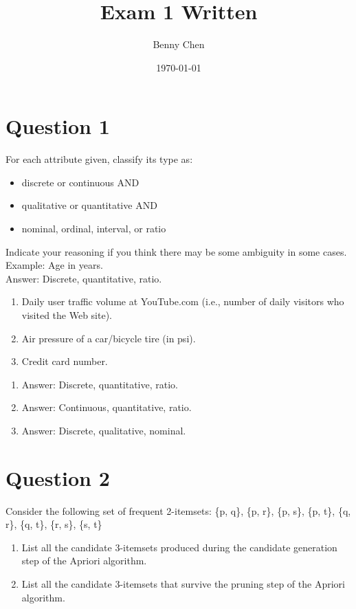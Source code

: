 \documentclass{article}
\title{Exam 1 Written}
\author{Benny Chen}
\date{\today}
\begin{document}
\maketitle

\section*{Question 1}

For each attribute given, classify its type as:

\begin{itemize}
    \item discrete or continuous AND
    \item qualitative or quantitative AND 
    \item nominal, ordinal, interval, or ratio
\end{itemize}

\noindent
Indicate your reasoning if you think there may be some ambiguity in some cases.
\\
Example: Age in years.\\
Answer: Discrete, quantitative, ratio.

\begin{enumerate}[label=(\alph*)]
    \item Daily user traffic volume at YouTube.com (i.e., number of daily visitors who visited the Web site).
    \item Air pressure of a car/bicycle tire (in psi).
    \item Credit card number.
\end{enumerate}

\begin{enumerate}[label=(\alph*)]
    \item Answer: Discrete, quantitative, ratio.
    \item Answer: Continuous, quantitative, ratio.
    \item Answer: Discrete, qualitative, nominal.
\end{enumerate}

\section*{Question 2}

Consider the following set of frequent 2-itemsets:
\{p, q\}, \{p, r\}, \{p, s\}, \{p, t\}, \{q, r\}, \{q, t\}, \{r, s\}, \{s, t\}
\begin{enumerate}[label=(\alph*)]
    \item List all the candidate 3-itemsets produced during the candidate generation step of the Apriori algorithm.
    \item List all the candidate 3-itemsets that survive the pruning step of the Apriori algorithm.
\end{enumerate}
\end{document}
